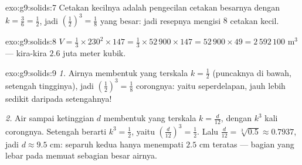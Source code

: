 \begin{solution}{exo:g9:solids:7}
Cetakan kecilnya adalah pengecilan cetakan besarnya dengan
$k = \frac36 = \frac12$, jadi 
$\left(\frac12\right)^3 = \frac18$  yang besar: jadi resepnya
mengisi $8$ cetakan kecil.
\end{solution}

\begin{solution}{exo:g9:solids:8}
$V = \frac13 \times 230^2 \times 147 = \frac13 \times 52\,900 \times 147
= 52\,900 \times 49 = 2\,592\,100$ m$^3$ --- kira-kira $2.6$ juta meter
kubik.
\end{solution}

\begin{solution}{exo:g9:solids:9}
\emph{1.} Airnya membentuk  yang terskala $k = \frac12$
(puncaknya di bawah, setengah tingginya), jadi 
$\left(\frac12\right)^3 = \frac18$  corongnya: yaitu
seperdelapan, jauh lebih sedikit daripada setengahnya!

\emph{2.} Air sampai ketinggian $d$ membentuk  yang terskala
$k = \frac{d}{12}$, dengan  $k^3$ kali  corongnya.
Setengah  berarti $k^3 = \frac12$, yaitu
$\left(\frac{d}{12}\right)^3 = \frac12$. Lalu
$\frac{d}{12} = \sqrt[3]{0.5} \approx 0.7937$, jadi
$d \approx 9.5$ cm: separuh kedua  hanya menempati
$2.5$ cm teratas --- bagian yang lebar pada  memuat
sebagian besar airnya.
\end{solution}

